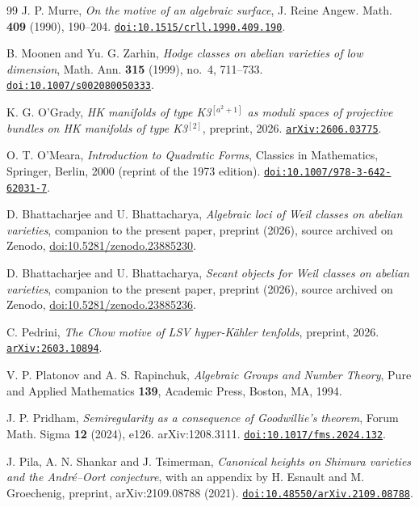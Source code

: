\begin{thebibliography}{99}
J. P. Murre,
\emph{On the motive of an algebraic surface},
J. Reine Angew. Math. \textbf{409} (1990), 190--204.
\href{https://doi.org/10.1515/crll.1990.409.190}{\texttt{doi:10.1515/crll.1990.409.190}}.

B. Moonen and Yu. G. Zarhin,
\emph{Hodge classes on abelian varieties of low dimension},
Math. Ann. \textbf{315} (1999), no.~4, 711--733.
\href{https://doi.org/10.1007/s002080050333}{\texttt{doi:10.1007/s002080050333}}.

K. G. O'Grady,
\emph{HK manifolds of type K3$^{[a^{2}+1]}$ as moduli spaces of projective
bundles on HK manifolds of type K3$^{[2]}$},
preprint, 2026.
\href{https://arxiv.org/abs/2606.03775}{\texttt{arXiv:2606.03775}}.

O. T. O'Meara,
\emph{Introduction to Quadratic Forms},
Classics in Mathematics, Springer, Berlin, 2000 (reprint of the 1973 edition).
\href{https://doi.org/10.1007/978-3-642-62031-7}{\texttt{doi:10.1007/978-3-642-62031-7}}.

D. Bhattacharjee and U. Bhattacharya,
\emph{Algebraic loci of Weil classes on abelian varieties},
companion to the present paper, preprint (2026), source archived on Zenodo,
\href{https://doi.org/10.5281/zenodo.23885230}{doi:10.5281/zenodo.23885230}.

D. Bhattacharjee and U. Bhattacharya,
\emph{Secant objects for Weil classes on abelian varieties},
companion to the present paper, preprint (2026), source archived on Zenodo,
\href{https://doi.org/10.5281/zenodo.23885236}{doi:10.5281/zenodo.23885236}.

C. Pedrini,
\emph{The Chow motive of LSV hyper-K\"ahler tenfolds},
preprint, 2026.
\href{https://arxiv.org/abs/2603.10894}{\texttt{arXiv:2603.10894}}.

V. P. Platonov and A. S. Rapinchuk,
\emph{Algebraic Groups and Number Theory},
Pure and Applied Mathematics \textbf{139},
Academic Press, Boston, MA, 1994.

J. P. Pridham,
\emph{Semiregularity as a consequence of Goodwillie's theorem},
Forum Math. Sigma \textbf{12} (2024), e126. arXiv:1208.3111.
\href{https://doi.org/10.1017/fms.2024.132}{\texttt{doi:10.1017/fms.2024.132}}.

J. Pila, A. N. Shankar and J. Tsimerman,
\emph{Canonical heights on Shimura varieties and the Andr\'e--Oort
conjecture}, with an appendix by H. Esnault and M. Groechenig,
preprint, arXiv:2109.08788 (2021).
\href{https://doi.org/10.48550/arXiv.2109.08788}{\texttt{doi:10.48550/arXiv.2109.08788}}.


\end{thebibliography}
